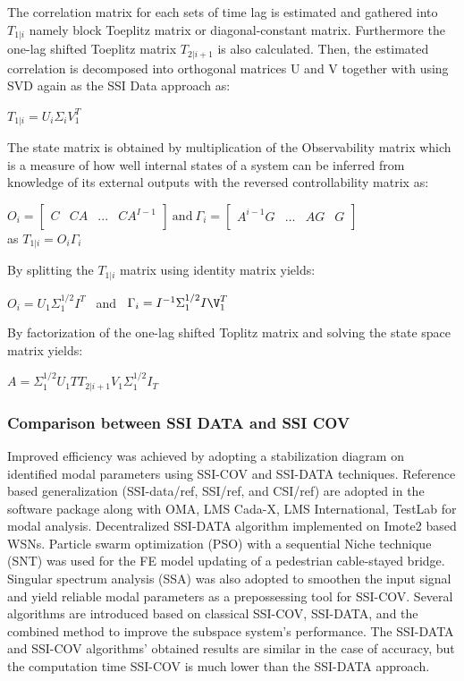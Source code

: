 \documentclass{article}
\begin{document}
The correlation matrix for each sets of time lag is estimated and gathered into $T_{1|i}$ namely block Toeplitz matrix or diagonal-constant matrix. Furthermore the one-lag shifted Toeplitz matrix $T_{2|i+1}$ is also calculated. Then, the estimated correlation is decomposed into orthogonal matrices U and V together with using SVD again as the SSI Data approach as:

\begin{center}
    $T_{1|i} = U_i\Sigma_i V_1^T$
\end{center}

The state matrix is obtained by multiplication of the Observability matrix which is a measure of how well internal states of a system can be inferred from knowledge of its external outputs with the reversed controllability matrix as:

\begin{center}
    $O_i = \begin{bmatrix} C&CA&...&CA^{I-1}\\ \end{bmatrix} \ \text{and} \ \Gamma_i = \begin{bmatrix} A^{i-1}G&...&AG&G\\ \end{bmatrix}$ \\as $T_{1|i} = O_i\Gamma_i$
\end{center}

By splitting the $T_{1|i}$ matrix using identity matrix yields:

\begin{center}
    $O_i = U_1\Sigma_1^{1/2}I^T$ \ and \ $\Gamma_i = I^{-1}\Sigma_1^{1/2}I\V_1^T$
\end{center}

By factorization of the one-lag shifted Toplitz matrix and solving the state space matrix yields:

\begin{center}
    $A = \Sigma_1^{1/2}U_1TT_{2|i+1}V_1\Sigma_1^{1/2}I_T$
\end{center}

\subsubsection{Comparison between SSI DATA and SSI COV}
Improved efficiency was achieved by adopting a stabilization diagram on identified modal parameters using SSI-COV and SSI-DATA techniques. Reference based generalization (SSI-data/ref, SSI/ref, and CSI/ref) are adopted in the software package along with OMA, LMS Cada-X, LMS International, TestLab for modal analysis. Decentralized SSI-DATA algorithm implemented on Imote2 based WSNs. Particle swarm optimization (PSO) with a sequential Niche technique (SNT) was used for the FE model updating of a pedestrian cable-stayed bridge. Singular spectrum analysis (SSA) was also adopted to smoothen the input signal and yield reliable modal parameters as a prepossessing tool for SSI-COV. Several algorithms are introduced based on classical SSI-COV, SSI-DATA, and the combined method to improve the subspace system's performance. The SSI-DATA and SSI-COV algorithms' obtained results are similar in the case of accuracy, but the computation time SSI-COV is much lower than the SSI-DATA approach.
\end{document}
